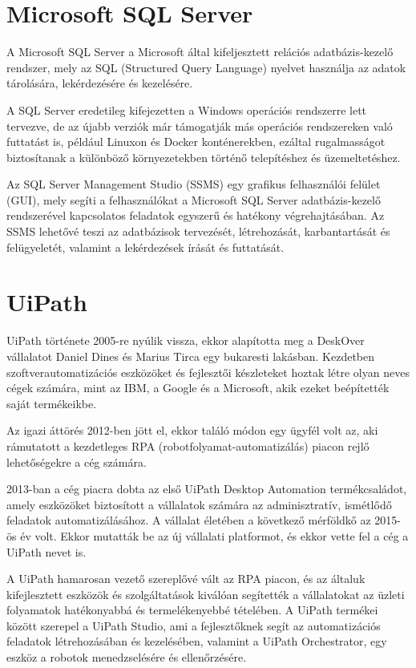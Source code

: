 \documentclass[
]{thesis-ekf}
\theoremstyle{definition}
\theoremstyle{remark}
\begin{document}
\section{Microsoft SQL Server \cite{SQL} \cite{SSMA}}
A Microsoft SQL Server a Microsoft által kifeljesztett relációs adatbázis-kezelő rendszer, mely az SQL (Structured Query Language) nyelvet használja az adatok tárolására, lekérdezésére és kezelésére. 

A SQL Server eredetileg kifejezetten a Windows operációs rendszerre lett tervezve, de az újabb verziók már támogatják más operációs rendszereken való futtatást is, például Linuxon és Docker konténerekben, ezáltal rugalmasságot biztosítanak a különböző környezetekben történő telepítéshez és üzemeltetéshez.

Az SQL Server Management Studio (SSMS) egy grafikus felhasználói felület (GUI), mely segíti a felhasználókat a Microsoft SQL Server adatbázis-kezelő rendszerével kapcsolatos feladatok egyszerű és hatékony végrehajtásában. Az SSMS lehetővé teszi az adatbázisok tervezését, létrehozását, karbantartását és felügyeletét, valamint a lekérdezések írását és futtatását.
\section{UiPath \cite{UiPath}}
UiPath története 2005-re nyúlik vissza, ekkor alapította meg a DeskOver vállalatot Daniel Dines és Marius Tirca egy bukaresti lakásban. Kezdetben szoftverautomatizációs eszközöket és fejlesztői készleteket hoztak létre olyan neves cégek számára, mint az IBM, a Google és a Microsoft, akik ezeket beépítették saját termékeikbe. 

Az igazi áttörés 2012-ben jött el, ekkor találó módon egy ügyfél volt az, aki rámutatott a kezdetleges RPA (robotfolyamat-automatizálás) piacon rejlő lehetőségekre a cég számára.

2013-ban a cég piacra dobta az első UiPath Desktop Automation termékcsaládot, amely eszközöket biztosított a vállalatok számára az adminisztratív, ismétlődő feladatok automatizálásához. A vállalat életében a következő mérföldkő az 2015-ös év volt. Ekkor mutatták be az új vállalati platformot, és ekkor vette fel a cég a UiPath nevet is.

A UiPath hamarosan vezető szereplővé vált az RPA piacon, és az általuk kifejlesztett eszközök és szolgáltatások kiválóan segítették a vállalatokat az üzleti folyamatok hatékonyabbá és termelékenyebbé tételében. A UiPath termékei között szerepel a UiPath Studio, ami a fejlesztőknek segít az automatizációs feladatok létrehozásában és kezelésében, valamint a UiPath Orchestrator, egy eszköz a robotok menedzselésére és ellenőrzésére.
\end{document}
